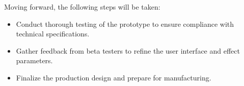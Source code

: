 Moving forward, the following steps will be taken:
\begin{itemize}
\item Conduct thorough testing of the prototype to ensure compliance with technical specifications.
\item Gather feedback from beta testers to refine the user interface and effect parameters.
\item Finalize the production design and prepare for manufacturing.
\end{itemize}
